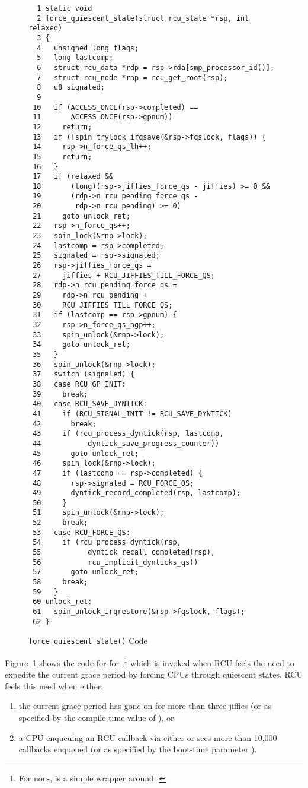 \begin{figure}[tbp]
{ \scriptsize
\begin{verbatim}
  1 static void
  2 force_quiescent_state(struct rcu_state *rsp, int relaxed)
  3 {
  4   unsigned long flags;
  5   long lastcomp;
  6   struct rcu_data *rdp = rsp->rda[smp_processor_id()];
  7   struct rcu_node *rnp = rcu_get_root(rsp);
  8   u8 signaled;
  9
 10   if (ACCESS_ONCE(rsp->completed) ==
 11       ACCESS_ONCE(rsp->gpnum))
 12     return;
 13   if (!spin_trylock_irqsave(&rsp->fqslock, flags)) {
 14     rsp->n_force_qs_lh++;
 15     return;
 16   }
 17   if (relaxed &&
 18       (long)(rsp->jiffies_force_qs - jiffies) >= 0 &&
 19       (rdp->n_rcu_pending_force_qs -
 20        rdp->n_rcu_pending) >= 0)
 21     goto unlock_ret;
 22   rsp->n_force_qs++;
 23   spin_lock(&rnp->lock);
 24   lastcomp = rsp->completed;
 25   signaled = rsp->signaled;
 26   rsp->jiffies_force_qs =
 27     jiffies + RCU_JIFFIES_TILL_FORCE_QS;
 28   rdp->n_rcu_pending_force_qs =
 29     rdp->n_rcu_pending +
 30     RCU_JIFFIES_TILL_FORCE_QS;
 31   if (lastcomp == rsp->gpnum) {
 32     rsp->n_force_qs_ngp++;
 33     spin_unlock(&rnp->lock);
 34     goto unlock_ret;
 35   }
 36   spin_unlock(&rnp->lock);
 37   switch (signaled) {
 38   case RCU_GP_INIT:
 39     break;
 40   case RCU_SAVE_DYNTICK:
 41     if (RCU_SIGNAL_INIT != RCU_SAVE_DYNTICK)
 42       break;
 43     if (rcu_process_dyntick(rsp, lastcomp,
 44           dyntick_save_progress_counter))
 45       goto unlock_ret;
 46     spin_lock(&rnp->lock);
 47     if (lastcomp == rsp->completed) {
 48       rsp->signaled = RCU_FORCE_QS;
 49       dyntick_record_completed(rsp, lastcomp);
 50     }
 51     spin_unlock(&rnp->lock);
 52     break;
 53   case RCU_FORCE_QS:
 54     if (rcu_process_dyntick(rsp,
 55           dyntick_recall_completed(rsp),
 56           rcu_implicit_dynticks_qs))
 57       goto unlock_ret;
 58     break;
 59   }
 60 unlock_ret:
 61   spin_unlock_irqrestore(&rsp->fqslock, flags);
 62 }
\end{verbatim}
}
\caption{{\tt force\_quiescent\_state()} Code}
\label{fig:app:rcuimpl:rcutreewt:Code for rcutree force-quiescent-state}
\end{figure}

Figure~\ref{fig:app:rcuimpl:rcutreewt:Code for rcutree force-quiescent-state}
shows the code for  for
,\footnote{
	For non-,  is a
	simple wrapper around .}
which is invoked when RCU feels the need to expedite the current
grace period by forcing CPUs through quiescent states.
RCU feels this need when either:
\begin{enumerate}
\item	the current grace period has gone on for more than three jiffies
	(or as specified by the compile-time value of
	), or
\item	a CPU enqueuing an RCU callback via either 
	or  sees more than 10,000 callbacks enqueued
	(or as specified by the boot-time parameter ).
\end{enumerate}

